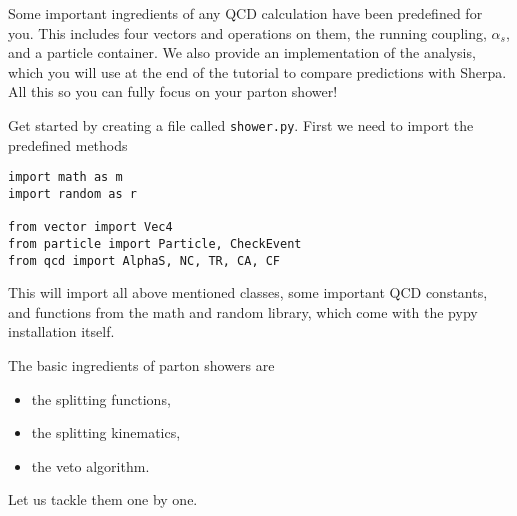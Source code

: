 \documentclass[10pt,fleqn]{scrartcl}
\begin{document}
Some important ingredients of any QCD calculation have been predefined for you.
This includes four vectors and operations on them, the running
coupling, $\alpha_s$, and a particle container. We also provide an implementation
of the analysis, which you will use at the end of the tutorial to compare predictions
with Sherpa. All this so you can fully focus on your parton shower!

Get started by creating a file called {\tt shower.py}.
First we need to import the predefined methods
\begin{verbatim}
import math as m
import random as r

from vector import Vec4
from particle import Particle, CheckEvent
from qcd import AlphaS, NC, TR, CA, CF
\end{verbatim}
This will import all above mentioned classes, some important QCD constants,
and functions from the math and random library, which come with the pypy
installation itself.

The basic ingredients of parton showers are
\begin{itemize}
\item the splitting functions,
\item the splitting kinematics,
\item the veto algorithm.
\end{itemize}
Let us tackle them one by one.
\end{document}
